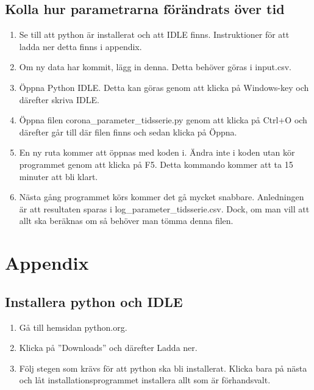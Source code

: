 \documentclass[a4paper, 12pt]{article}
\theoremstyle{definition}
\begin{document}
\subsection{Kolla hur parametrarna förändrats över tid}
\begin{enumerate}
  \item Se till att python är installerat och att IDLE finns. Instruktioner för att ladda ner detta finns i appendix.
  \item Om ny data har kommit, lägg in denna. Detta behöver göras i input.csv.
  \item Öppna Python IDLE. Detta kan göras genom att klicka på Windows-key och därefter skriva IDLE.
  \item Öppna filen corona\_parameter\_tidsserie.py genom att klicka på Ctrl+O och därefter går till där filen finns och sedan klicka på Öppna.
  \item En ny ruta kommer att öppnas med koden i. Ändra inte i koden utan kör programmet genom att klicka på F5. Detta kommando kommer att ta 15 minuter att bli klart.
  \item Nästa gång programmet körs kommer det gå mycket snabbare. Anledningen är att resultaten sparas i log\_parameter\_tidsserie.csv. Dock, om man vill att allt ska beräknas om så behöver man tömma denna filen.
\end{enumerate}

\section{Appendix}
\subsection{Installera python och IDLE}
\begin{enumerate}
  \item Gå till hemsidan python.org.
  \item Klicka på ''Downloads'' och därefter Ladda ner.
  \item Följ stegen som krävs för att python ska bli installerat. Klicka bara på nästa och låt installationsprogrammet installera allt som är förhandsvalt.
\end{enumerate}
\end{document}
